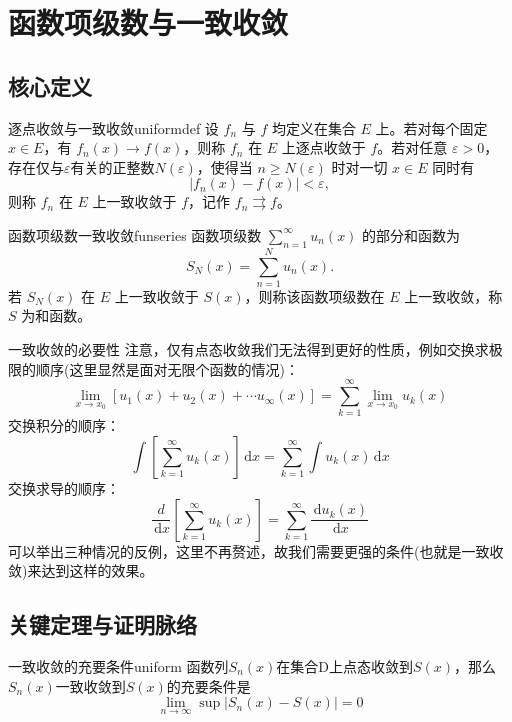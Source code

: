 \documentclass[UTF8,zihao=-4,openany]{ctexbook}
\newcommand{\dd}{\,\mathrm{d}}
\begin{document}
\chapter{函数项级数与一致收敛}
\section{核心定义}
\begin{definition}{逐点收敛与一致收敛}{uniformdef}
设 $f_n$ 与 $f$ 均定义在集合 $E$ 上。若对每个固定 $x\in E$，有 $f_n(x)\to f(x)$，则称 $f_n$ 在 $E$ 上逐点收敛于 $f$。若对任意 $\varepsilon>0$，存在仅与\(\varepsilon\)有关的正整数$N(\varepsilon)$，使得当 $n\ge N(\varepsilon)$ 时对一切 $x\in E$ 同时有
\[
|f_n(x)-f(x)|<\varepsilon,
\]
则称 $f_n$ 在 $E$ 上一致收敛于 $f$，记作 $f_n\rightrightarrows f$。
\end{definition} 

\begin{definition}{函数项级数一致收敛}{funseries}
函数项级数 $\sum_{n=1}^{\infty}u_n(x)$ 的部分和函数为
\[
S_N(x)=\sum_{n=1}^{N}u_n(x).
\]
若 $S_N(x)$ 在 $E$ 上一致收敛于 $S(x)$，则称该函数项级数在 $E$ 上一致收敛，称 $S$ 为和函数。
\end{definition}

\begin{warningbox}{一致收敛的必要性}
    注意，仅有点态收敛我们无法得到更好的性质，例如交换求极限的顺序(这里显然是面对无限个函数的情况)：\[
    \lim_{x\to x_0}[u_1(x)+u_2(x)+\cdots u_{\infty}(x)]=\sum_{k=1}^{\infty}\lim_{x\to x_0}u_k(x)
    \]交换积分的顺序：\[
    \int[\sum_{k=1}^{\infty}u_k(x)]\dd x=\sum_{k=1}^{\infty}\int u_k(x)\dd x
    \]交换求导的顺序：\[
    \frac{d}{\dd x}[\sum_{k=1}^{\infty}u_k(x)]=\sum_{k=1}^{\infty}\frac{\dd u_k(x)}{\dd x}
    \]可以举出三种情况的反例，这里不再赘述，故我们需要更强的条件(也就是一致收敛)来达到这样的效果。
\end{warningbox}




\section{关键定理与证明脉络}

\begin{theorem}{一致收敛的充要条件}{uniform}
    函数列\(S_n(x)\)在集合D上点态收敛到\(S(x)\)，那么\(S_n(x)\)一致收敛到\(S(x)\)的充要条件是\[
    \lim_{n\to \infty}\sup|S_n(x)-S(x)|=0
    \]
\end{theorem}
\end{document}
